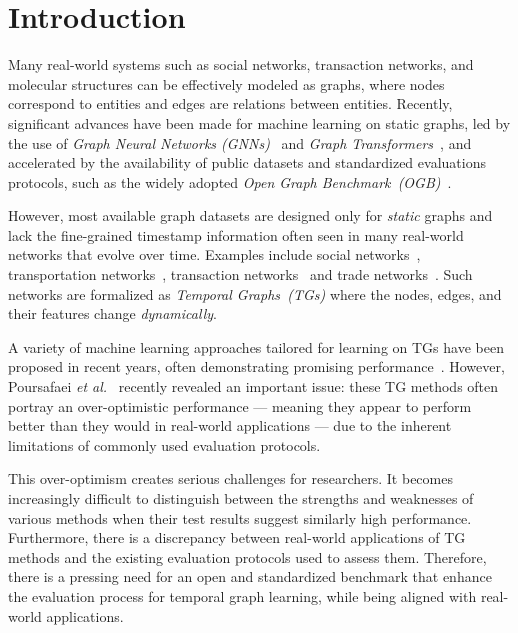 \section{Introduction}
Many real-world systems such as social networks, transaction networks, and molecular structures can be effectively modeled as graphs, where nodes correspond to entities and edges are relations between entities. Recently, significant advances have been made for machine learning on static graphs, led by the use of \emph{Graph Neural Networks (GNNs)}~\cite{kipfsemi,velivckovic2017graph,chen2019equivalence} and \emph{Graph Transformers}~\cite{rampavsek2022recipe,kreuzer2021rethinking,dwivedi2020generalization}, and accelerated by the availability of public datasets and standardized evaluations protocols, such as the widely adopted \emph{Open Graph Benchmark~(OGB)}~\cite{hu2020open}.  


However, most available graph datasets are designed only for {\em static} graphs and lack the fine-grained timestamp information often seen in many real-world networks that evolve over time. Examples include social networks~\cite{pareja2020evolvegcn}, transportation networks~\cite{cini2022scalable}, transaction networks~\cite{shamsi2022chartalist} and trade networks~\cite{poursafaeitowards}.
Such networks are formalized as \emph{Temporal Graphs~(TGs)} where the nodes, edges, and their features change {\em dynamically}. 

A variety of machine learning approaches tailored for learning on TGs have been proposed in recent years, often demonstrating promising performance~\cite{rossi2020temporal,congwe,souza2022provably,luoneighborhood,jin2022neural}. However, Poursafaei \emph{et al.}~\cite{poursafaeitowards} recently revealed an important issue: these TG methods often portray an over-optimistic performance — meaning they appear to perform better than they would in  real-world applications — due to the inherent limitations of commonly used evaluation protocols.

This over-optimism creates serious challenges for researchers. It becomes increasingly difficult to distinguish between the strengths and weaknesses of various methods when their test results suggest similarly high performance. Furthermore, there is a discrepancy between real-world applications of TG methods and the existing evaluation protocols used to assess them. Therefore, there is a pressing need for an open and standardized benchmark that enhance the evaluation process for temporal graph learning, while being aligned with real-world applications.

